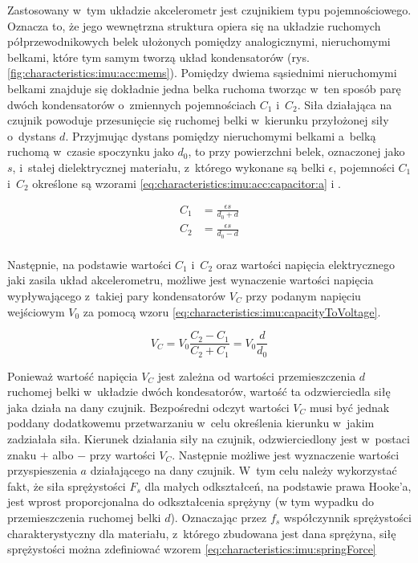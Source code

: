 																																											
Zastosowany w~tym układzie akcelerometr jest czujnikiem typu pojemnościowego. Oznacza to, że jego wewnętrzna struktura opiera się na układzie ruchomych półprzewodnikowych belek ułożonych pomiędzy analogicznymi, nieruchomymi belkami, które tym samym tworzą układ kondensatorów (rys. \ref{fig:characteristics:imu:acc:mems}). Pomiędzy dwiema sąsiednimi nieruchomymi belkami znajduje się dokładnie jedna belka ruchoma tworząc w~ten sposób parę dwóch kondensatorów o~zmiennych pojemnościach $C_1$ i~$C_2$. Siła działająca na czujnik powoduje przesunięcie się ruchomej belki w~kierunku przyłożonej siły o~dystans $d$. Przyjmując dystans pomiędzy nieruchomymi belkami a~belką ruchomą w~czasie spoczynku jako $d_0$, to przy powierzchni belek, oznaczonej jako $s$, i~stałej dielektrycznej materiału, z~którego wykonane są belki $\epsilon$, pojemności $C_1$ i~$C_2$ określone są wzorami \ref{eq:characteristics:imu:acc:capacitor:a} i \label{eq:characteristics:imu:acc:capacitor:b} .
																																												
\begin{subequations}
	\begin{align}
		C_1 & = \frac{\epsilon s}{d_0 + d}\label{eq:characteristics:imu:acc:capacitor:a} \\ 
		C_2 & = \frac{\epsilon s}{d_0 - d}\label{eq:characteristics:imu:acc:capacitor:b} \\		
	\end{align}
\end{subequations}
																																												
Następnie, na podstawie wartości $C_1$ i~$C_2$ oraz wartości napięcia elektrycznego jaki zasila układ akcelerometru, możliwe jest wynaczenie wartości napięcia wypływającego z~takiej pary kondensatorów $V_C$ przy podanym napięciu wejściowym $V_0$ za pomocą wzoru \ref{eq:characteristics:imu:capacityToVoltage}.
																																											
\begin{equation}
	V_C = V_0 \frac{C_2-C_1}{C_2+C_1} = V_0\frac{d}{d_0}
	\label{eq:characteristics:imu:capacityToVoltage}
\end{equation}
																																												
Ponieważ wartość napięcia $V_C$ jest zależna od wartości przemieszczenia $d$ ruchomej belki w~układzie dwóch kondesatorów, wartość ta odzwierciedla siłę jaka działa na dany czujnik. Bezpośredni odczyt wartości $V_C$ musi być jednak poddany dodatkowemu przetwarzaniu w~celu określenia kierunku w~jakim zadziałała siła. Kierunek działania siły na czujnik, odzwierciedlony jest w~postaci znaku $+$ albo $-$ przy wartości $V_C$. Następnie możliwe jest wyznaczenie wartości przyspieszenia $a$ działającego na dany czujnik. W~tym celu należy wykorzystać fakt, że siła sprężystości $F_s$ dla małych odkształceń, na podstawie prawa Hooke'a, jest wprost proporcjonalna do odkształcenia sprężyny (w tym wypadku do przemieszczenia ruchomej belki $d$). Oznaczając przez $f_s$ współczynnik sprężystości charakterystyczny dla materiału, z~którego zbudowana jest dana sprężyna, siłę sprężystości można zdefiniować wzorem \ref{eq:characteristics:imu:springForce}
																																											
